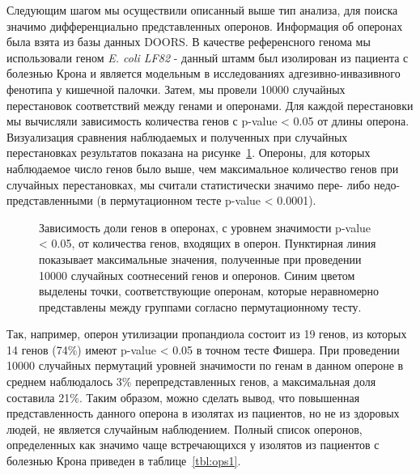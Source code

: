 Следующим шагом мы осуществили описанный выше тип анализа, для поиска значимо дифференциально представленных оперонов. Информация об оперонах была взята из базы данных DOORS. В качестве референсного генома мы использовали геном \textit{E. coli LF82} - данный штамм был изолирован из пациента с болезнью Крона и является модельным в исследованиях адгезивно-инвазивного фенотипа у кишечной палочки. Затем, мы провели 10000 случайных перестановок соответствий между генами и оперонами. Для каждой перестановки мы вычисляли зависимость количества генов с p-value < 0.05 от длины оперона. Визуализация сравнения наблюдаемых и полученных при случайных перестановках результатов показана на рисунке~\ref{img:operons_shuffle}. Опероны, для которых наблюдаемое число генов было выше, чем максимальное количество генов при случайных перестановках, мы считали статистически значимо пере- либо недо-представленными (в пермутационном тесте p-value < 0.0001). 

\begin{figure}[!ht] 
  \center
    \setlength{\fboxsep}{10pt}%
    \setlength{\fboxrule}{0pt}%
    \caption{Зависимость доли генов в оперонах, с уровнем значимости p-value < 0.05, от количества генов, входящих в оперон. Пунктирная линия показывает максимальные значения, полученные при проведении 10000 случайных соотнесений генов и оперонов. Синим цветом выделены точки, соответствующие оперонам, которые неравномерно представлены между группами согласно пермутационному тесту.}
    \label{img:operons_shuffle}
\end{figure}

Так, например, оперон утилизации пропандиола состоит из 19 генов, из которых 14 генов (74\%) имеют p-value < 0.05 в точном тесте Фишера. При проведении 10000 случайных пермутаций уровней значимости по генам в данном опероне в среднем наблюдалось 3\% перепредставленных генов, а максимальная доля составила 21\%. Таким образом, можно сделать вывод, что повышенная представленность данного оперона в изолятах из пациентов, но не из здоровых людей, не является случайным наблюдением. Полный список оперонов, определенных как значимо чаще встречающихся у изолятов из пациентов с болезнью Крона приведен в таблице~\ref{tbl:ops1}. 

